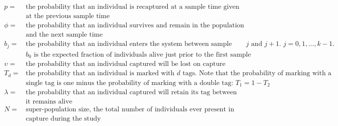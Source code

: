 \documentclass[]{article}
\begin{document}
\[
  \begin{array}{ll}
      p= & \text{the probability that an individual is recaptured at a sample time given that the individual was alive}\\
      & \text{at the previous sample time} \\
      \phi=  & \text{the probability that an individual survives and remain in the population between a sample time}\\
      & \text{and the next sample time }\\
      b_j= & \text{the probability that an individual enters the system between sample times $j$ and $j+1$. $j=0,1,...,k-1$.}\\
       & \text{$b_0$ is the expected fraction of individuals alive just prior to the first sample time.}\\
      \upsilon= & \text{the probability that an individual captured will be lost on capture}\\
      T_d= & \text{the probability that an individual is marked with $d$ tags. Note that the probability of marking with a }\\
      & \text{single tag is one minus the probability of marking with a double tag: $T_1=1-T_2$}\\
      \lambda= & \text{the probability that an individual captured will  retain its tag between time periods given that}\\
      & \text{it remains alive}\\
      N= & \text{super-population size, the total number of individuals ever present in population and available for}\\
      & \text{capture during the study}\\
  \end{array}
\]
\end{document}
